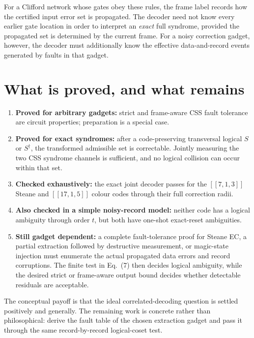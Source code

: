 \documentclass[11pt]{article}
\theoremstyle{remark}
\begin{document}
For a Clifford network whose gates obey these rules, the frame label records
how the certified input error set is propagated.  The decoder need not know
every earlier gate location in order to interpret an \emph{exact} full
syndrome, provided the propagated set is determined by the current frame.
For a noisy correction gadget, however, the decoder must additionally know
the effective data-and-record events generated by faults in that gadget.

\section{What is proved, and what remains}

\begin{enumerate}[leftmargin=*,itemsep=3pt]
  \item \textbf{Proved for arbitrary gadgets:} strict and frame-aware CSS
        fault tolerance are circuit properties; preparation is a special
        case.
  \item \textbf{Proved for exact syndromes:} after a code-preserving
        transversal logical $S$ or $S^\dagger$, the transformed admissible
        set is correctable.  Jointly measuring the two CSS syndrome channels
        is sufficient, and no logical collision can occur within that set.
  \item \textbf{Checked exhaustively:} the exact joint decoder passes for
        the $[[7,1,3]]$ Steane and $[[17,1,5]]$ colour codes through their
        full correction radii.
  \item \textbf{Also checked in a simple noisy-record model:} neither code
        has a logical ambiguity through order $t$, but both have one-shot
        exact-reset ambiguities.
  \item \textbf{Still gadget dependent:} a complete fault-tolerance proof
        for Steane EC, a partial extraction followed by destructive
        measurement, or magic-state injection must enumerate the actual
        propagated data errors and record corruptions.  The finite test in
        Eq.~(7) then decides logical ambiguity, while the desired strict or
        frame-aware output bound decides whether detectable residuals are
        acceptable.
\end{enumerate}

The conceptual payoff is that the ideal correlated-decoding question is
settled positively and generally.  The remaining work is concrete rather
than philosophical: derive the fault table of the chosen extraction gadget
and pass it through the same record-by-record logical-coset test.
\end{document}
